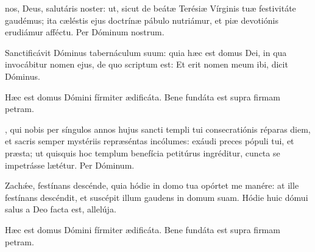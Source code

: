 \documentclass[fontsize=9pt,paper=A6,twoside,BCOR=1mm,DIV=22,headinclude]{scrarticle}
\begin{document}
\begin{multicols}{2}








\AiiV 

\VRVii 

 nos, Deus, salutáris noster: ut, sicut de beátæ Terésiæ Vírginis tuæ festivitáte gaudémus; ita cæléstis ejus doctrínæ pábulo nutriámur, et piæ devotiónis erudiámur afféctu. Per Dóminum nostrum.


\columnbreak
{}


\A Sanctificávit Dóminus tabernáculum suum: quia hæc est domus Dei, in qua invocábitur nomen ejus, de quo scriptum est: Et erit nomen meum ibi, dicit Dóminus.

\V Hæc est domus Dómini fírmiter ædificáta.
\R Bene fundáta est supra firmam petram.

, qui nobis per síngulos annos hujus sancti templi tui consecratiónis réparas diem, et sacris semper mystériis repræséntas incólumes: exáudi preces pópuli tui, et præsta; ut quisquis hoc templum benefícia petitúrus ingréditur, cuncta se impetrásse lætétur. Per Dóminum.


\A Zach\'æe, festínans descénde, quia hódie in domo tua opórtet me manére: at ille festínans descéndit, et suscépit illum gaudens in domum suam. Hódie huic dómui salus a Deo facta est, allelúja.

\V Hæc est domus Dómini fírmiter ædificáta.
\R Bene fundáta est supra firmam petram.


\end{multicols}
\end{document}
